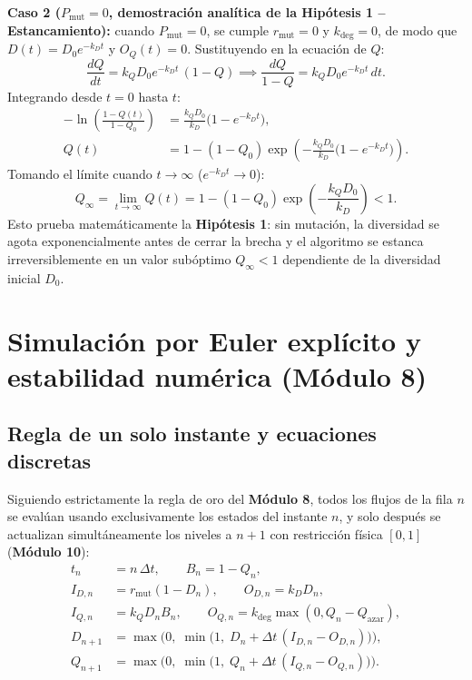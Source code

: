 \documentclass[11pt,a4paper]{article}
\begin{document}
\textbf{Caso 2 ($P_{\text{mut}} = 0$, demostraci\'on anal\'itica de la Hip\'otesis 1 -- Estancamiento):} cuando $P_{\text{mut}} = 0$, se cumple $r_{\text{mut}} = 0$ y $k_{\text{deg}} = 0$, de modo que $D(t) = D_0 e^{-k_D t}$ y $O_Q(t) = 0$. Sustituyendo en la ecuaci\'on de $Q$:
\begin{equation}
\frac{dQ}{dt} = k_Q D_0 e^{-k_D t}\,(1 - Q) \implies
\frac{dQ}{1 - Q} = k_Q D_0 e^{-k_D t}\,dt.
\end{equation}
Integrando desde $t=0$ hasta $t$:
\begin{align}
-\ln\!\left(\frac{1 - Q(t)}{1 - Q_0}\right) &= \frac{k_Q D_0}{k_D}\big(1 - e^{-k_D t}\big), \\
Q(t) &= 1 - (1 - Q_0)\exp\!\left(-\frac{k_Q D_0}{k_D}\big(1 - e^{-k_D t}\big)\right).
\end{align}
Tomando el l\'imite cuando $t \to \infty$ ($e^{-k_D t} \to 0$):
\begin{equation}
Q_\infty = \lim_{t \to \infty} Q(t) = 1 - (1 - Q_0)\exp\!\left(-\frac{k_Q D_0}{k_D}\right) < 1.
\label{eq:estancamiento}
\end{equation}
Esto prueba matem\'aticamente la \textbf{Hip\'otesis 1}: sin mutaci\'on, la diversidad se agota exponencialmente antes de cerrar la brecha y el algoritmo se estanca irreversiblemente en un valor sub\'optimo $Q_\infty < 1$ dependiente de la diversidad inicial $D_0$.

\section{Simulaci\'on por Euler expl\'icito y estabilidad num\'erica (M\'odulo 8)}

\subsection{Regla de un solo instante y ecuaciones discretas}

Siguiendo estrictamente la regla de oro del \textbf{M\'odulo 8}, todos los flujos de la fila $n$ se eval\'uan usando exclusivamente los estados del instante $n$, y solo despu\'es se actualizan simult\'aneamente los niveles a $n+1$ con restricci\'on f\'isica $[0,1]$ (\textbf{M\'odulo 10}):
\begin{align}
t_n &= n\,\Delta t, \qquad B_n = 1 - Q_n, \\
I_{D,n} &= r_{\text{mut}}(1 - D_n), \qquad O_{D,n} = k_D D_n, \\
I_{Q,n} &= k_Q D_n B_n, \qquad O_{Q,n} = k_{\text{deg}}\max(0, Q_n - Q_{\text{azar}}), \\
D_{n+1} &= \max\!\Big(0,\; \min\!\big(1,\; D_n + \Delta t\,(I_{D,n} - O_{D,n})\big)\Big), \\
Q_{n+1} &= \max\!\Big(0,\; \min\!\big(1,\; Q_n + \Delta t\,(I_{Q,n} - O_{Q,n})\big)\Big).
\end{align}
\end{document}
